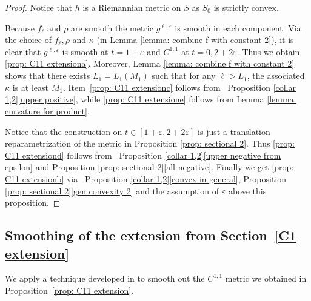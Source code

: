 \documentclass[JEP,XML,SOM,Unicode,NoFloatCountersInSection]{cedram}
\theoremstyle{definition}
\let\eps\varepsilon
\renewcommand{\>}{{\rangle}}
\newcommand{\<}{{\langle}}
\begin{document}
\begin{proof}
Notice that $h$ is a Riemannian metric on $S$ as $S_0$ is strictly convex.

Because $f_\ell$ and $\rho$ are smooth the metric $g^{\ell,\eps}$ is smooth in each component. Via the choice of $f_\ell, \rho$ and $\kappa$ (in Lemma \ref{lemma: combine f with constant 2}), it is clear that $g^{\ell,\eps}$ is smooth at $t=1+\eps$ and $C^{1,1}$ at $t=0, 2+2\eps$. Thus we obtain \eqref{prop: C11 extensiona}. Moreover, Lemma \ref{lemma: combine f with constant 2} shows that there exists $\tilde{L}_1=\tilde{L}_1(M_1)$ such that for any $\ell>\tilde{L}_1$, the associated $\kappa$ is at least $M_1$.
Item~\eqref{prop: C11 extensionc} follows from ~Proposition \ref{collar 1,2}\eqref{upper positive}, while \eqref{prop: C11 extensione} follows from Lemma \ref{lemma: curvature for product}.

Notice that the construction on $t\in[1+\eps,2+2\eps]$ is just a translation reparametrization of the metric in Proposition \ref{prop: sectional 2}. Thus \eqref{prop: C11 extensiond} follows from ~Proposition \ref{collar 1,2}\eqref{upper negative from epsilon} and Proposition \ref{prop: sectional 2}\eqref{all negative}. Finally we get \eqref{prop: C11 extensionb} via ~Proposition \ref{collar 1,2}\eqref{convex in general}, Proposition \ref{prop: sectional 2}\eqref{gen convexity 2} and the assumption of $\eps$ above this proposition.
\end{proof}

\subsection{Smoothing of the extension from Section~\ref{C1 extension}}\label{smooth extension}

We apply a technique developed in \cite{EK19} to smooth out the $C^{1,1}$ metric we obtained in Proposition~\ref{prop: C11 extension}.
\end{document}
